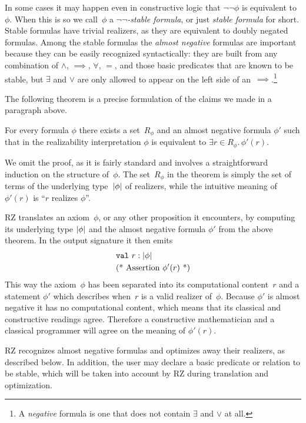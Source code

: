 In some cases it may happen even in constructive logic that
$\lnot\lnot\phi$ is equivalent to~$\phi$. When this is so we
call~$\phi$ a \emph{$\lnot\lnot$-stable formula}, or just \emph{stable
  formula} for short. Stable formulas have trivial realizers, as they
are equivalent to doubly negated formulas. Among the stable formulas
the \emph{almost negative} formulas are important because they can be
easily recognized syntactically: they are built from any combination
of $\land$, $\implies$, $\forall$, $=$, and those basic predicates
that are known to be stable, but $\exists$ and $\lor$ are only allowed
to appear on the left side of an~$\implies$.\footnote{A
  \emph{negative} formula is one that does not contain $\exists$ and
  $\lor$ at all.}

The following theorem is a precise formulation of the claims we made
in a paragraph above.

\begin{theorem}
  For every formula $\phi$ there exists a set~$R_\phi$ and an almost
  negative formula $\phi'$ such that in the realizability
  interpretation $\phi$ is equivalent to $\exists r \in R_\phi . \,
  \phi'(r)$.
\end{theorem}

We omit the proof, as it is fairly standard and involves a
straightforward induction on the structure of~$\phi$. The set~$R_\phi$
in the theorem is simply the set of terms of the underlying
type~$|\phi|$ of realizers, while the intuitive meaning of
$\phi'(r)$ is ``$r$ realizes $\phi$''.

RZ translates an axiom~$\phi$, or any other proposition it encounters,
by computing its underlying type $|\phi|$ and the almost negative
formula $\phi'$ from the above theorem. In the output signature it
then emits
%
\begin{align*}
  & \mathtt{val}\ r : |\phi| \\
  & \text{(* Assertion $\phi'(r)$ *)}
\end{align*}
%
This way the axiom~$\phi$ has been separated into its computational
content~$r$ and a statement $\phi'$ which describes when~$r$ is a
valid realizer of~$\phi$. Because $\phi'$ is almost negative it has no
computational content, which means that its classical and constructive
readings agree. Therefore a constructive mathematician and a classical
programmer will agree on the meaning of $\phi'(r)$.

RZ recognizes almost negative formulas and optimizes away their
realizers, as described below. In addition, the user may declare a
basic predicate or relation to be stable, which will be taken into
account by RZ during translation and optimization.

